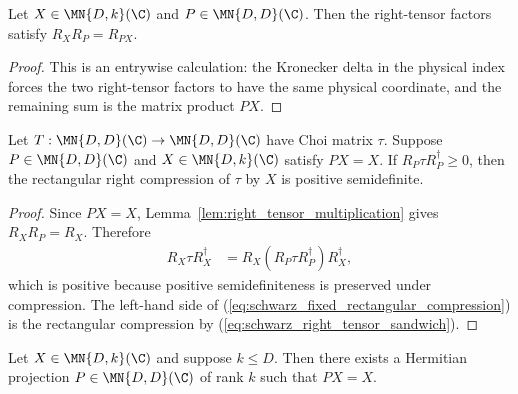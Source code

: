 \begin{lemma}
    \label{lem:right_tensor_multiplication}
    \leanok
    Let $X\in\MN{D,k}(\C)$ and $P\in\MN{D,D}(\C)$. Then the right-tensor
    factors satisfy $R_XR_P=R_{PX}$.
\end{lemma}

\begin{proof}
    \leanok
    This is an entrywise calculation: the Kronecker delta in the physical
    index forces the two right-tensor factors to have the same physical
    coordinate, and the remaining sum is the matrix product $PX$.
\end{proof}

\begin{lemma}
    \label{lem:square_sandwich_fixed_rectangular_compression}
    \leanok
    Let $T:\MN{D,D}(\C)\to\MN{D,D}(\C)$ have Choi matrix $\tau$. Suppose
    $P\in\MN{D,D}(\C)$ and $X\in\MN{D,k}(\C)$ satisfy $PX=X$. If
    $R_P\tau R_P^\dagger\ge0$, then the rectangular right compression of
    $\tau$ by $X$ is positive semidefinite.
\end{lemma}

\begin{proof}
    \leanok
    Since $PX=X$, Lemma~\ref{lem:right_tensor_multiplication} gives
    $R_XR_P=R_X$. Therefore
    \begin{align}
        R_X\tau R_X^\dagger
         & =R_X(R_P\tau R_P^\dagger)R_X^\dagger,
        \label{eq:schwarz_fixed_rectangular_compression}
    \end{align}
    which is positive because positive semidefiniteness is preserved under
    compression. The left-hand side of
    (\ref{eq:schwarz_fixed_rectangular_compression}) is the rectangular
    compression by (\ref{eq:schwarz_right_tensor_sandwich}).
\end{proof}

\begin{lemma}
    \label{lem:rank_k_projection_fixing_rectangular_factor}
    \leanok
    Let $X\in\MN{D,k}(\C)$ and suppose $k\le D$. Then there exists a
    Hermitian projection $P\in\MN{D,D}(\C)$ of rank $k$ such that $PX=X$.
\end{lemma}

